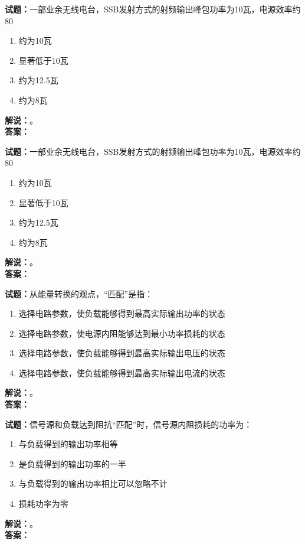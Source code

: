 \documentclass{ctexbook}
\begin{document}
\vspace{\baselineskip}

\noindent\textbf{试题：}一部业余无线电台，SSB发射方式的射频输出峰包功率为10瓦，电源效率约80%
\begin{enumerate}[leftmargin=3em]
  \item 约为10瓦
  \item 显著低于10瓦
  \item 约为12.5瓦
  \item 约为8瓦
\end{enumerate}
\noindent\textbf{解说：}\textbf{}。\\\noindent\textbf{答案：}

\vspace{\baselineskip}

\noindent\textbf{试题：}一部业余无线电台，SSB发射方式的射频输出峰包功率为10瓦，电源效率约80%
\begin{enumerate}[leftmargin=3em]
  \item 约为10瓦
  \item 显著低于10瓦
  \item 约为12.5瓦
  \item 约为8瓦
\end{enumerate}
\noindent\textbf{解说：}\textbf{}。\\\noindent\textbf{答案：}

\vspace{\baselineskip}

\noindent\textbf{试题：}从能量转换的观点，“匹配”是指：
\begin{enumerate}[leftmargin=3em]
  \item 选择电路参数，使负载能够得到最高实际输出功率的状态
  \item 选择电路参数，使电源内阻能够达到最小功率损耗的状态
  \item 选择电路参数，使负载能够得到最高实际输出电压的状态
  \item 选择电路参数，使负载能够得到最高实际输出电流的状态
\end{enumerate}
\noindent\textbf{解说：}\textbf{}。\\\noindent\textbf{答案：}

\vspace{\baselineskip}

\noindent\textbf{试题：}信号源和负载达到阻抗“匹配”时，信号源内阻损耗的功率为：
\begin{enumerate}[leftmargin=3em]
  \item 与负载得到的输出功率相等
  \item 是负载得到的输出功率的一半
  \item 与负载得到的输出功率相比可以忽略不计
  \item 损耗功率为零
\end{enumerate}
\noindent\textbf{解说：}\textbf{}。\\\noindent\textbf{答案：}
\end{document}
